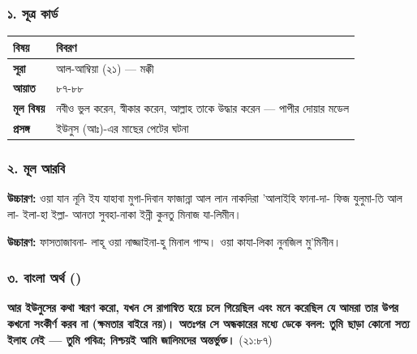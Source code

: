 \subsubsection*{১. সূত্র কার্ড}

\begin{table}[h]\centering\small
\begin{tabular}{ll}
বিষয় & বিবরণ \\
\hline
\textbf{সূরা} & আল-আম্বিয়া (২১) — মক্কী \\
\textbf{আয়াত} & ৮৭-৮৮ \\
\textbf{মূল বিষয়} & নবীও ভুল করেন, স্বীকার করেন, আল্লাহ তাকে উদ্ধার করেন — পাপীর দোয়ার মডেল \\
\textbf{প্রসঙ্গ} & ইউনুস (আঃ)-এর মাছের পেটের ঘটনা \\
\hline
\end{tabular}
\end{table}

\subsubsection*{২. মূল আরবি}

\begin{center}\end{center}
\textbf{উচ্চারণ:} ওয়া যান নূনি ইয যাহাবা মুগা-দিবান ফাজান্না আল লান নাকদিরা 'আলাইহি ফানা-দা- ফিজ যুলুমা-তি আল লা- ইলা-হা ইল্লা- আনতা সুবহা-নাকা ইন্নী কুনতু মিনাজ যা-লিমীন।

\begin{center}\end{center}
\textbf{উচ্চারণ:} ফাসতাজাবনা- লাহূ ওয়া নাজ্জাইনা-হু মিনাল গাম্ম। ওয়া কাযা-লিকা নুনজিল মু'মিনীন।

\subsubsection*{৩. বাংলা অর্থ ()}

\textbf{আর ইউনুসের কথা স্মরণ করো, যখন সে রাগান্বিত হয়ে চলে গিয়েছিল এবং মনে করেছিল যে আমরা তার উপর কখনো সংকীর্ণ করব না (ক্ষমতার বাইরে নয়)। অতঃপর সে অন্ধকারের মধ্যে ডেকে বলল: তুমি ছাড়া কোনো সত্য ইলাহ নেই — তুমি পবিত্র; নিশ্চয়ই আমি জালিমদের অন্তর্ভুক্ত।} (২১:৮৭)

